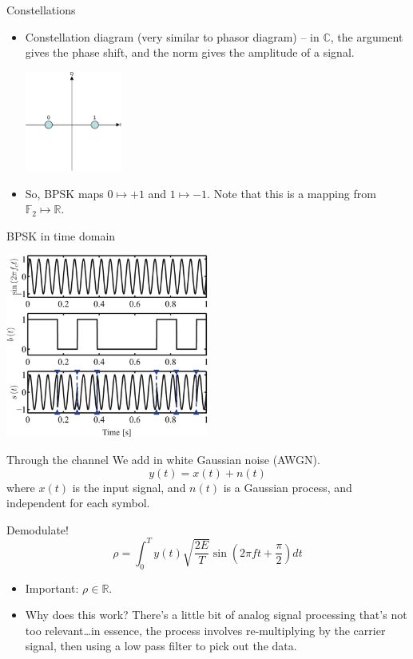 \documentclass[aspectratio=1610, 10pt]{beamer}
\begin{document}
\begin{frame}[label={sec:org2e34753}]{Constellations}
\begin{itemize}
\item Constellation diagram (very similar to phasor diagram) -- in
\(\mathbb{C}\), the argument gives the phase shift, and the norm gives
the amplitude of a signal.
\begin{center}
\includegraphics[width=0.25\textwidth]{./bpsk_const.png}
\end{center}
\item So, BPSK maps \(0\mapsto +1\) and \(1\mapsto -1\). Note that this is a
mapping from \(\mathbb{F}_2 \mapsto \mathbb{R}\).
\end{itemize}
\end{frame}

\begin{frame}[label={sec:org3e3f3d9}]{BPSK in time domain}
\begin{center}
\includegraphics[width=0.5\textwidth]{./bpsk_time_domain.png}
\end{center}
\end{frame}

\begin{frame}[label={sec:org776ca90}]{Through the channel}
We add in white Gaussian noise (AWGN).
$$y(t) = x(t) + n(t)$$
where \(x(t)\) is the input signal, and \(n(t)\) is a Gaussian process,
and independent for each symbol.
\end{frame}

\begin{frame}[label={sec:org55de732}]{Demodulate!}
$$\rho = \int_0^T y(t) \sqrt{\frac{2E}{T}}\sin{\left(2\pi ft +
\frac{\pi}{2} \right)} dt$$

\begin{itemize}
\item \alert{Important:} \(\rho\in\mathbb{R}\).
\item Why does this work? There's a little bit of analog signal processing
that's not too relevant\ldots{}in essence, the process involves
re-multiplying by the carrier signal, then using a low pass filter
to pick out the data.
\end{itemize}
\end{frame}
\end{document}
